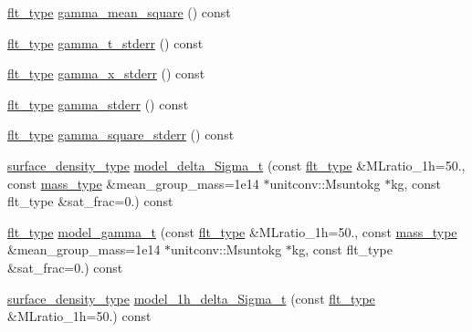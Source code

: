 \begin{DoxyCompactItemize}
\item 
\hyperlink{lib_2IceBRG__main_2common_8h_ad0f130a56eeb944d9ef2692ee881ecc4}{flt\+\_\+type} \hyperlink{classIceBRG_1_1pair__bin__summary_ae6e61497643df44dfb882614f4f8a436}{gamma\+\_\+mean\+\_\+square} () const 
\item 
\hyperlink{lib_2IceBRG__main_2common_8h_ad0f130a56eeb944d9ef2692ee881ecc4}{flt\+\_\+type} \hyperlink{classIceBRG_1_1pair__bin__summary_ac4b6d240243c897ce0bda3ccec204901}{gamma\+\_\+t\+\_\+stderr} () const 
\item 
\hyperlink{lib_2IceBRG__main_2common_8h_ad0f130a56eeb944d9ef2692ee881ecc4}{flt\+\_\+type} \hyperlink{classIceBRG_1_1pair__bin__summary_a8bfdc933188bc3253991fe257f0859b1}{gamma\+\_\+x\+\_\+stderr} () const 
\item 
\hyperlink{lib_2IceBRG__main_2common_8h_ad0f130a56eeb944d9ef2692ee881ecc4}{flt\+\_\+type} \hyperlink{classIceBRG_1_1pair__bin__summary_a0a02c950a58cc6844328266f8bc2c1fb}{gamma\+\_\+stderr} () const 
\item 
\hyperlink{lib_2IceBRG__main_2common_8h_ad0f130a56eeb944d9ef2692ee881ecc4}{flt\+\_\+type} \hyperlink{classIceBRG_1_1pair__bin__summary_ad2176d6b62e4c8cf70592252ae106d70}{gamma\+\_\+square\+\_\+stderr} () const 
\item 
\hyperlink{namespaceIceBRG_a80c597ef5ba0a32491d32a9f0083b02d}{surface\+\_\+density\+\_\+type} \hyperlink{classIceBRG_1_1pair__bin__summary_a4c15fe2fea325cc093bcd826658377c4}{model\+\_\+delta\+\_\+\+Sigma\+\_\+t} (const \hyperlink{lib_2IceBRG__main_2common_8h_ad0f130a56eeb944d9ef2692ee881ecc4}{flt\+\_\+type} \&M\+Lratio\+\_\+1h=50., const \hyperlink{namespaceIceBRG_a1be72ac4918a9b029f2eefa084213e35}{mass\+\_\+type} \&mean\+\_\+group\+\_\+mass=1e14 $\ast$unitconv\+::\+Msuntokg $\ast$kg, const flt\+\_\+type \&sat\+\_\+frac=0.) const 
\item 
\hyperlink{lib_2IceBRG__main_2common_8h_ad0f130a56eeb944d9ef2692ee881ecc4}{flt\+\_\+type} \hyperlink{classIceBRG_1_1pair__bin__summary_aa49f4e7780a495607acbef6c74f2d33c}{model\+\_\+gamma\+\_\+t} (const \hyperlink{lib_2IceBRG__main_2common_8h_ad0f130a56eeb944d9ef2692ee881ecc4}{flt\+\_\+type} \&M\+Lratio\+\_\+1h=50., const \hyperlink{namespaceIceBRG_a1be72ac4918a9b029f2eefa084213e35}{mass\+\_\+type} \&mean\+\_\+group\+\_\+mass=1e14 $\ast$unitconv\+::\+Msuntokg $\ast$kg, const flt\+\_\+type \&sat\+\_\+frac=0.) const 
\item 
\hyperlink{namespaceIceBRG_a80c597ef5ba0a32491d32a9f0083b02d}{surface\+\_\+density\+\_\+type} \hyperlink{classIceBRG_1_1pair__bin__summary_adbc2af143460d725fcc07537517c5119}{model\+\_\+1h\+\_\+delta\+\_\+\+Sigma\+\_\+t} (const \hyperlink{lib_2IceBRG__main_2common_8h_ad0f130a56eeb944d9ef2692ee881ecc4}{flt\+\_\+type} \&M\+Lratio\+\_\+1h=50.) const 

\end{DoxyCompactItemize}

